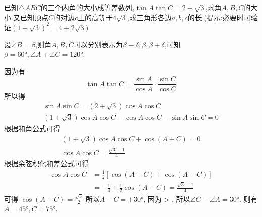 \begin{questions}
\begin{solution}
	\end{solution}

	\question[20] 已知$\triangle{ABC}$的三个内角的大小成等差数列,$\tan{A}\tan{C}=2+\sqrt{3}$,求角$A,B,C$的大小.又已知顶点$C$的对边$c$上的高等于$4\sqrt{3}$,求三角形各边$a,b,c$的长.(提示:必要时可验证$(1+\sqrt{3})^2=4+2\sqrt{3}$)
	\begin{center}
	\end{center}
	\begin{solution}
		设$\angle{B}=\beta$,则角$A,B,C$可以分别表示为$\beta-\delta, \beta, \beta + \delta$,可知$\beta=\ang{60},
			\angle{A}+\angle{C} = \ang{120}$.

		因为有
		\begin{equation*}
			\tan{A}\tan{C}  = \frac{\sin{A}}{\cos{A}}\cdot\frac{\sin{C}}{\cos{C}}
		\end{equation*}
		所以得
		\begin{align*}
			\sin{A}\sin{C} = (2+\sqrt{3})\cos{A}\cos{C} \\
			(1+\sqrt{3})\cos{A}\cos{C} + \cos{A}\cos{C} - \sin{A}\sin{C} = 0
		\end{align*}
		根据和角公式可得
		\begin{align*}
			(1+\sqrt{3})\cos{A}\cos{C} + \cos(A+C)= 0 \\
			\cos{A}\cos{C} = \frac{\sqrt{3}-1}{4}
		\end{align*}
		根据余弦积化和差公式可得
		\begin{align*}
			\cos{A}\cos{C} & = \frac12[\cos(A+C)+\cos(A-C)]                        \\
			               & = -\frac14 + \frac12\cos(A-C)  = \frac{\sqrt{3}-1}{4}
		\end{align*}
		可得
		\begin{math}
			\cos(A-C) = \frac{\sqrt{3}}{2}
		\end{math}
		所以$A-C=\pm\ang{30}$, 因为 > , 所以$\angle{C}-\angle{A}=\ang{30}$. 则有$A=\ang{45}, C=\ang{75}$.


\end{solution}
\end{questions}
